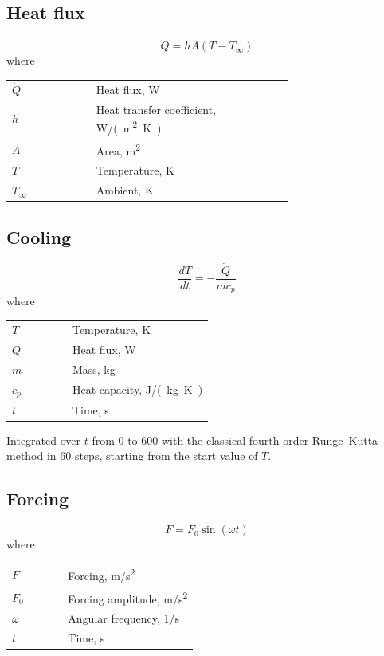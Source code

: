 \documentclass[11pt,a4paper]{article}
\begin{document}
\subsection{Heat flux}
\begin{equation}
  \dot{Q} = h A (T - T_\infty)
  \label{eq:heat-flux}
\end{equation}
\noindent where

\noindent\begin{tabular}{@{\quad}l@{\quad}p{0.7\linewidth}@{}}
  $\dot{Q}$ & Heat flux, \si{W} \\
  $h$ & Heat transfer coefficient, \si{W/(m^{2}.K)} \\
  $A$ & Area, \si{m^{2}} \\
  $T$ & Temperature, \si{K} \\
  $T_\infty$ & Ambient, \si{K} \\
\end{tabular}


\subsection{Cooling}
\begin{equation}
  \frac{dT}{dt} = -\frac{\dot{Q}}{m c_p}
  \label{eq:cooling}
\end{equation}
\noindent where

\noindent\begin{tabular}{@{\quad}l@{\quad}p{0.7\linewidth}@{}}
  $T$ & Temperature, \si{K} \\
  $\dot{Q}$ & Heat flux, \si{W} \\
  $m$ & Mass, \si{kg} \\
  $c_p$ & Heat capacity, \si{J/(kg.K)} \\
  $t$ & Time, \si{s} \\
\end{tabular}

\noindent Integrated over $t$ from $0$ to $600$ with the classical fourth-order Runge–Kutta method in 60 steps, starting from the start value of $T$.

\subsection{Forcing}
\begin{equation}
  F = F_0 \sin(\omega t)
  \label{eq:forcing}
\end{equation}
\noindent where

\noindent\begin{tabular}{@{\quad}l@{\quad}p{0.7\linewidth}@{}}
  $F$ & Forcing, \si{m/s^{2}} \\
  $F_0$ & Forcing amplitude, \si{m/s^{2}} \\
  $\omega$ & Angular frequency, \si{1/s} \\
  $t$ & Time, \si{s} \\
\end{tabular}
\end{document}
